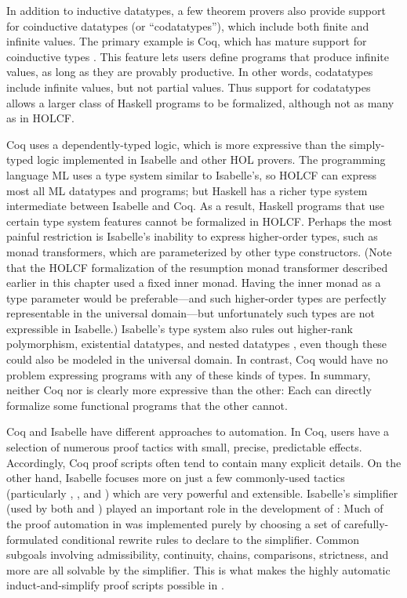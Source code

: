 In addition to inductive datatypes, a few theorem provers also provide support for coinductive datatypes (or ``codatatypes''), which include both finite and infinite values. The primary example is Coq, which has mature support for coinductive types \cite{Gimenez1995}. This feature lets users define programs that produce infinite values, as long as they are provably productive. In other words, codatatypes include infinite values, but not partial values. Thus support for codatatypes allows a larger class of Haskell programs to be formalized, although not as many as in HOLCF.

Coq uses a dependently-typed logic, which is more expressive than the simply-typed logic implemented in Isabelle and other HOL provers. The programming language ML uses a type system similar to Isabelle's, so HOLCF can express most all ML datatypes and programs; but Haskell has a richer type system intermediate between Isabelle and Coq. 
As a result, Haskell programs that use certain type system features cannot be formalized in HOLCF. Perhaps the most painful restriction is Isabelle's inability to express higher-order types, such as monad transformers, which are parameterized by other type constructors. (Note that the HOLCF formalization of the resumption monad transformer described earlier in this chapter used a fixed inner monad. Having the inner monad as a type parameter would be preferable---and such higher-order types are perfectly representable in the  universal domain---but unfortunately such types are not expressible in Isabelle.) Isabelle's type system also rules out higher-rank polymorphism, existential datatypes, and nested datatypes \cite{bird98nested}, even though these could also be modeled in the universal domain. In contrast, Coq would have no problem expressing programs with any of these kinds of types. In summary, neither Coq nor  is clearly more expressive than the other: Each can directly formalize some functional programs that the other cannot.

Coq and Isabelle have different approaches to automation. In Coq, users have a selection of numerous proof tactics with small, precise, predictable effects. Accordingly, Coq proof scripts often tend to contain many explicit details. On the other hand, Isabelle focuses more on just a few commonly-used tactics (particularly , , and ) which are very powerful and extensible. Isabelle's simplifier (used by both  and ) played an important role in the development of : Much of the proof automation in  was implemented purely by choosing a set of carefully-formulated conditional rewrite rules to declare to the simplifier. Common subgoals involving admissibility, continuity, chains, comparisons, strictness, and more are all solvable by the simplifier. This is what makes the highly automatic induct-and-simplify proof scripts possible in .

